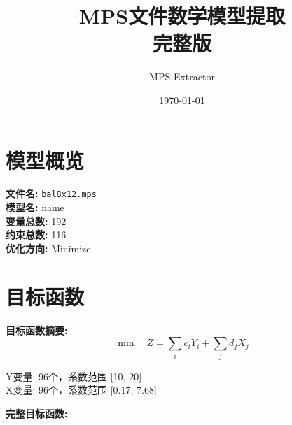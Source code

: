 \documentclass[a4paper,10pt]{article}
\title{MPS文件数学模型提取\\{\large 完整版}}
\author{MPS Extractor}
\date{\today}
\begin{document}
\maketitle
\tableofcontents
\newpage

\section{模型概览}

\textbf{文件名:} \texttt{bal8x12.mps} \\
\textbf{模型名:} name \\
\textbf{变量总数:} 192 \\
\textbf{约束总数:} 116 \\
\textbf{优化方向:} Minimize \\

\section{目标函数}

\textbf{目标函数摘要:}
\begin{equation}
\min \quad Z = \sum_{i} c_i Y_i + \sum_{j} d_j X_j
\end{equation}

Y变量: 96个，系数范围 [10, 20] \\
X变量: 96个，系数范围 [0.17, 7.68]

\textbf{完整目标函数:}
\end{document}
